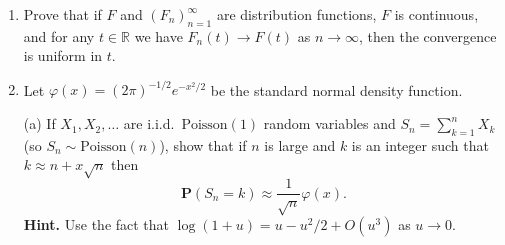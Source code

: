\documentclass[12pt]{article}
\newtheorem*{unnumberedthm}{Theorem}
\newcommand{\R}{\mathbb{R}}
\newcommand{\prob}{\mathbf{P}}
\theoremstyle{example}
\begin{document}
\begin{enumerate}
\paragraph{Notes.} When $X_1$ is a ``random sign'', i.e., a random variable that takes the values $-1,+1$ with respective probabilities $1/2,1/2$, the sequence of cumulative sums $(S_n)_{n=1}^\infty$ is often called a \textbf{(symmetric) random walk on $\mathbb{Z}$}, since it represents the trajectory of a walker starting from 0 and taking a sequence of independent jumps in a random (positive or negative) direction. An interesting question concerns the rate at which the random walk can drift away from its starting point. By the SLLN, it follows that almost surely, $S_n = o(n)$, so the distance of the random walk from the origin almost surely has sub-linear growth. By the exercise above, the stronger result $S_n = o(n^{1/2+\epsilon})$ also holds for all $\epsilon$. This is close to optimal, since by the Central Limit Theorem which we will discuss soon, one cannot hope to show that $S_n = o(n^{1/2})$. In fact, the ``true'' rate of growth is given by the following famous theorem, whose proof is a (somewhat complicated) elaboration on the techniques we have discussed.

\begin{unnumberedthm}[The Law of the Iterated Logarithm (A. Y. Khinchin, 1924)]
$$ \prob\left(\limsup_{n\to\infty} \frac{S_n}{\sqrt{2n \log\log n}} = 1\right) = 1. $$
Therefore, by symmetry, also
$$ \prob\left(\liminf_{n\to\infty} \frac{S_n}{\sqrt{2n \log\log n}} = -1\right) = 1. $$
\end{unnumberedthm}

It follows in particular that, almost surely, the random walk will cross the origin infinitely many times.

\item Prove that if $F$ and $(F_n)_{n=1}^\infty$ are distribution functions, $F$ is continuous, and for any $t\in \R$ we have $F_n(t)\to F(t)$ as $n\to\infty$, then the convergence is uniform in $t$.

\item Let $\varphi(x)=(2\pi)^{-1/2} e^{-x^2/2}$ be the standard normal density function. %

\medskip\noindent
(a) If $X_1,X_2,\ldots$ are i.i.d.\ $\textrm{Poisson}(1)$ random variables and $S_n=\sum_{k=1}^n X_k$ (so $S_n \sim \textrm{Poisson}(n)$), show that if $n$ is large and $k$ is an integer such that $k\approx n+x\sqrt{n}$ then
$$ \prob(S_n=k) \approx \frac{1}{\sqrt{n}} \varphi(x). $$
\textbf{Hint.} Use the fact that $\log(1+u)=u-u^2/2 + O(u^3)$ as $u\to 0$.


\end{enumerate}
\end{document}
